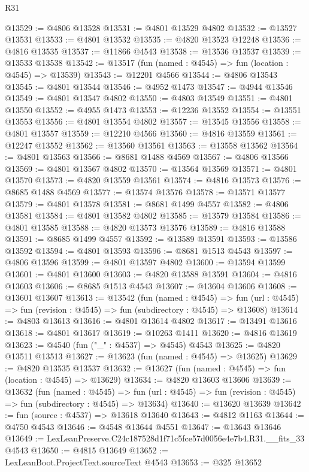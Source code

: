 \begin{lexlean}{R31}
\begin{coremodule}
@13529 := @4806 @13528
@13531 := @4801 @13529 @4802
@13532 := @13527 @13531
@13533 := @4801 @13532
@13535 := @4820 @13523 @12248
@13536 := @4816 @13535
@13537 := @11866 @4543
@13538 := @13536 @13537
@13539 := @13533 @13538
@13542 := @13517 (fun (named : @4545) => fun (location : @4545) => @13539)
@13543 := @12201 @4566
@13544 := @4806 @13543
@13545 := @4801 @13544
@13546 := @4952 @1473
@13547 := @4944 @13546
@13549 := @4801 @13547 @4802
@13550 := @4803 @13549
@13551 := @4801 @13550
@13552 := @4955 @1473
@13553 := @12236 @13552
@13554 := @13551 @13553
@13556 := @4801 @13554 @4802
@13557 := @13545 @13556
@13558 := @4801 @13557
@13559 := @12210 @4566
@13560 := @4816 @13559
@13561 := @12247 @13552
@13562 := @13560 @13561
@13563 := @13558 @13562
@13564 := @4801 @13563
@13566 := @8681 @1488 @4569
@13567 := @4806 @13566
@13569 := @4801 @13567 @4802
@13570 := @13564 @13569
@13571 := @4801 @13570
@13573 := @4820 @13559 @13561
@13574 := @4816 @13573
@13576 := @8685 @1488 @4569
@13577 := @13574 @13576
@13578 := @13571 @13577
@13579 := @4801 @13578
@13581 := @8681 @1499 @4557
@13582 := @4806 @13581
@13584 := @4801 @13582 @4802
@13585 := @13579 @13584
@13586 := @4801 @13585
@13588 := @4820 @13573 @13576
@13589 := @4816 @13588
@13591 := @8685 @1499 @4557
@13592 := @13589 @13591
@13593 := @13586 @13592
@13594 := @4801 @13593
@13596 := @8681 @1513 @4543
@13597 := @4806 @13596
@13599 := @4801 @13597 @4802
@13600 := @13594 @13599
@13601 := @4801 @13600
@13603 := @4820 @13588 @13591
@13604 := @4816 @13603
@13606 := @8685 @1513 @4543
@13607 := @13604 @13606
@13608 := @13601 @13607
@13613 := @13542
    (fun (named : @4545) =>
    fun (url : @4545) => fun (revision : @4545) => fun (subdirectory : @4545) => @13608)
@13614 := @4803 @13613
@13616 := @4801 @13614 @4802
@13617 := @13491 @13616
@13618 := @4801 @13617
@13619 := @10263 @1411
@13620 := @4816 @13619
@13623 := @4540 (fun ("_" : @4537) => @4545) @4543
@13625 := @4820 @13511 @13513
@13627 := @13623 (fun (named : @4545) => @13625)
@13629 := @4820 @13535 @13537
@13632 := @13627 (fun (named : @4545) => fun (location : @4545) => @13629)
@13634 := @4820 @13603 @13606
@13639 := @13632
    (fun (named : @4545) =>
    fun (url : @4545) => fun (revision : @4545) => fun (subdirectory : @4545) => @13634)
@13640 := @13620 @13639
@13642 := fun (source : @4537) => @13618 @13640
@13643 := @4812 @1163
@13644 := @4750 @4543
@13646 := @4548 @13644 @4551
@13647 := @13643 @13646
@13649 := LexLeanPreserve.C24c187528d1f71c5fce57d0056e4e7b4.R31.__fits_33 @4543
@13650 := @4815 @13649
@13652 := LexLeanBoot.ProjectText.sourceText @4543
@13653 := @325 @13652

\end{coremodule}
\end{lexlean}
